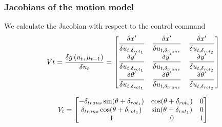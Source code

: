 \begin{frame}
    \frametitle{Jacobians of the motion model}
    
    We calculate the Jacobian with respect to the control command
    \begin{equation*}
    V{t} = \dfrac{\delta g\left( u_{t},\mu_{t-1} \right)}{\delta u_{t}} =
    \begin{bmatrix}
    \dfrac{\delta x^{\prime}}{\delta u_{t,\delta_{rot_{1}}}} & \dfrac{\delta x^{\prime}}{\delta u_{t,\delta_{trans}}} & \dfrac{\delta x^{\prime}}{\delta u_{t,\delta_{rot_{2}}}}\\
     \dfrac{\delta y^{\prime}}{\delta u_{t,\delta _{rot_{1}}}} & \dfrac{\delta y^{\prime}}{\delta u_{t,\delta _{trans}}} & \dfrac{\delta y^{\prime}}{\delta u_{t,\delta _{rot_{2}}}}\\
     \dfrac{\delta \theta^{\prime}}{\delta u_{t,\delta _{rot_{1}}}} & \dfrac{\delta \theta^{\prime}}{\delta u_{t,\delta _{trans}}} & \dfrac{\delta \theta^{\prime}}{\delta u_{t,\delta _{rot_{2}}}}
     \end{bmatrix}
     \end{equation*}
    
     \begin{equation*}
     V_{t} =
     \begin{bmatrix}
     -\delta_{trans} \sin(\theta + \delta _{rot_{1}}) & \cos(\theta + \delta _{rot_{1}}) & 0\\
     \delta _{trans} \cos(\theta + \delta _{rot_{1}}) & \sin(\theta + \delta _{rot _{1}}) & 0\\
     1 & 0 & 1\\
     \end{bmatrix}
     \end{equation*}
    \end{frame}
    
